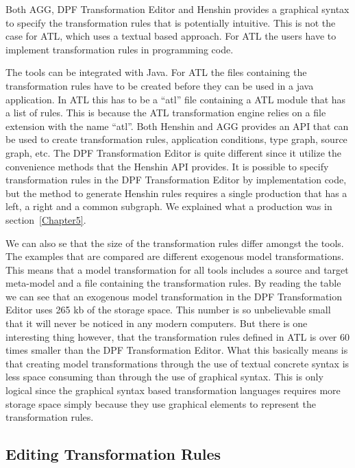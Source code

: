 Both AGG, DPF Transformation Editor and Henshin provides a graphical syntax to
specify the transformation rules that is potentially intuitive. This is not the
case for ATL, which uses a textual based approach. For ATL the users have to
implement transformation rules in programming code.

The tools can be integrated with Java. For ATL the files containing the
transformation rules have to be created before they can be used in a java
application. In ATL this has to be a ``atl'' file containing a ATL module that
has a list of rules. This is because the ATL transformation engine relies on a
file extension with the name ``atl''. Both Henshin and AGG provides an API that
can be used to create transformation rules, application conditions, type graph,
source graph, etc. The DPF Transformation Editor is quite different since it
utilize the convenience methods that the Henshin API provides. It is possible to
specify transformation rules in the DPF Transformation Editor by implementation
code, but the method to generate Henshin rules requires a single production that
has a left, a right and a common subgraph. We explained what a production was in
section~\ref{Chapter5}.

We can also se that the size of the transformation rules differ amongst the
tools. The examples that are compared are different exogenous model
transformations. This means that a model transformation for all tools
includes a source and target meta-model and a file containing the transformation
rules. By reading the table we can see that an exogenous model transformation in
the DPF Transformation Editor uses 265 kb of the storage space. This number is
so unbelievable small that it will never be noticed in any modern computers.
But there is one interesting thing however, that the transformation rules
defined in ATL is over 60 times smaller than the DPF Transformation Editor.
What this basically means is that creating model transformations through the
use of textual concrete syntax is less space consuming than through the use of
graphical syntax. This is only logical since the graphical syntax based
transformation languages requires more storage space simply because they use
graphical elements to represent the transformation rules.

\subsection{Editing Transformation Rules}

